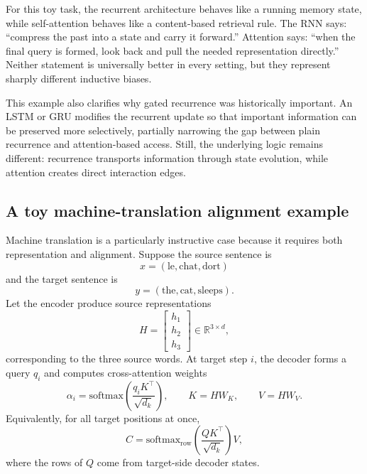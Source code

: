 \begin{example}
For this toy task, the recurrent architecture behaves like a running memory state, while self-attention behaves like a content-based retrieval rule.
The RNN says: ``compress the past into a state and carry it forward.''
Attention says: ``when the final query is formed, look back and pull the needed representation directly.''
Neither statement is universally better in every setting, but they represent sharply different inductive biases.
\end{example}

This example also clarifies why gated recurrence was historically important.
An LSTM or GRU modifies the recurrent update so that important information can be preserved more selectively, partially narrowing the gap between plain recurrence and attention-based access.
Still, the underlying logic remains different: recurrence transports information through state evolution, while attention creates direct interaction edges.

\subsection*{A toy machine-translation alignment example}

Machine translation is a particularly instructive case because it requires both representation and alignment.
Suppose the source sentence is
\[
x=(\text{le},\text{chat},\text{dort})
\]
and the target sentence is
\[
y=(\text{the},\text{cat},\text{sleeps}).
\]
Let the encoder produce source representations
\[
H=
\begin{bmatrix}
h_1\\ h_2\\ h_3
\end{bmatrix}
\in \mathbb{R}^{3 \times d},
\]
corresponding to the three source words.
At target step $i$, the decoder forms a query $q_i$ and computes cross-attention weights
\[
\alpha_i = \mathrm{softmax}\!\left(\frac{q_i K^{\top}}{\sqrt{d_k}}\right),
\qquad K=HW_K,
\qquad V=HW_V.
\]
Equivalently, for all target positions at once,
\[
C = \mathrm{softmax}_{\mathrm{row}}\!\left(\frac{QK^{\top}}{\sqrt{d_k}}\right)V,
\]
where the rows of $Q$ come from target-side decoder states.

